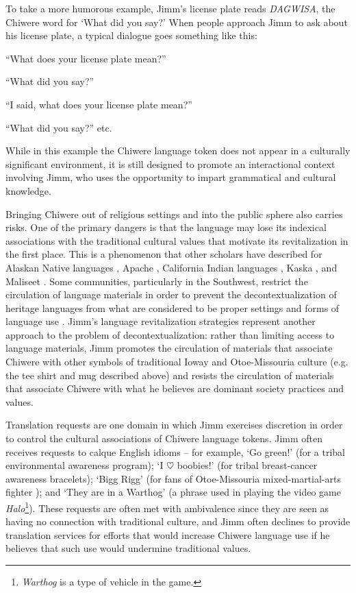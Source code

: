 \documentclass[output=paper]{LSP/langsci}
\begin{document}
To take a more humorous example, Jimm's license plate reads \emph{DAGWISA}, the Chiwere word for `What did you say?' When people approach Jimm to ask about his license plate, a typical dialogue goes something like this:

	``What does your license plate mean?''
	
	``What did you say?''
	
	``I said, what does your license plate mean?''
	
	``What did you say?'' etc.
	
While in this example the Chiwere language token does not appear in a culturally significant environment, it is still designed to promote an interactional context involving Jimm, who uses the opportunity to impart grammatical and cultural knowledge.

Bringing Chiwere out of religious settings and into the public sphere also carries risks. One of the primary dangers is that the language may lose its indexical associations with the traditional cultural values that motivate its revitalization in the first place. This is a phenomenon that other scholars have described for Alaskan Native languages \citep{DauenhauerDauenhauer1998}, Apache \citep{Nevins2013, Samuels2007}, California Indian languages \citep{Ahlers2006}, Kaska \citep{Meek2010}, and Maliseet \citep{Perley2011}. Some communities, particularly in the Southwest, restrict the circulation of language materials in order to prevent the decontextualization of heritage languages from what are considered to be proper settings and forms of language use \citep{Debenport2015, Whiteley2003}. Jimm's language revitalization strategies represent another approach to the problem of decontextualization: rather than limiting access to language materials, Jimm promotes the circulation of materials that associate Chiwere with other symbols of traditional Ioway and Otoe-Missouria culture (e.g. the tee shirt and mug described above) and resists the circulation of materials that associate Chiwere with what he believes are dominant society practices and values.

Translation requests are one domain in which Jimm exercises discretion in order to control the cultural associations of Chiwere language tokens. Jimm often receives requests to calque English idioms -- for example, `Go green!' (for a tribal environmental awareness program); `I $\heartsuit$ boobies!' (for tribal breast-cancer awareness bracelets); `Bigg Rigg' (for fans of Otoe-Missouria mixed-martial-arts fighter ); and `They are in a Warthog' (a phrase used in playing the video game \emph{Halo}\footnote{\emph{Warthog} is a type of vehicle in the game.}). These requests are often met with ambivalence since they are seen as having no connection with traditional culture, and Jimm often declines to provide translation services for efforts that would increase Chiwere language use if he believes that such use would undermine traditional values.
\end{document}
